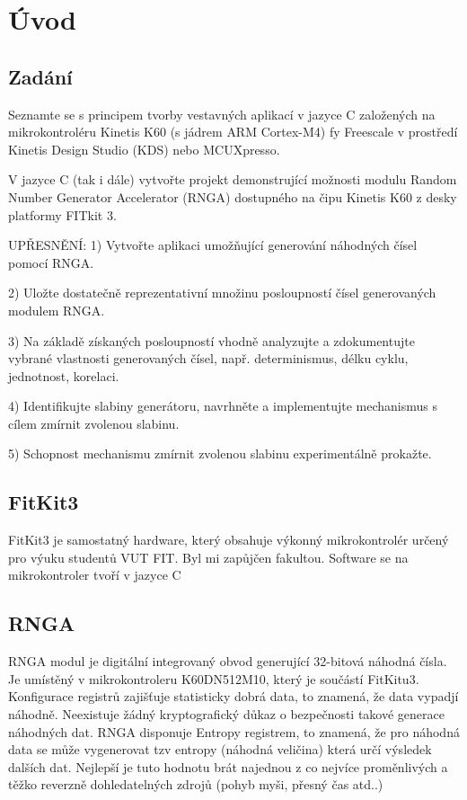 \documentclass[a4paper]{article}
\begin{document}
\section{Úvod}
\subsection{Zadání}
Seznamte se s principem tvorby vestavných aplikací v jazyce C založených na mikrokontroléru Kinetis K60 (s jádrem ARM Cortex-M4) fy Freescale v prostředí Kinetis Design Studio (KDS) nebo MCUXpresso.

\noindent V jazyce C (tak i dále) vytvořte projekt demonstrující možnosti modulu Random Number Generator Accelerator (RNGA) dostupného na čipu Kinetis K60 z desky platformy FITkit 3.

\noindent UPŘESNĚNÍ: 1) Vytvořte aplikaci umožňující generování náhodných čísel pomocí RNGA.

2) Uložte dostatečně reprezentativní množinu posloupností čísel generovaných modulem RNGA.

3) Na základě získaných posloupností vhodně analyzujte a zdokumentujte vybrané vlastnosti generovaných čísel, např. determinismus, délku cyklu, jednotnost, korelaci.

4) Identifikujte slabiny generátoru, navrhněte a implementujte mechanismus s cílem zmírnit zvolenou slabinu.

5) Schopnost mechanismu zmírnit zvolenou slabinu experimentálně prokažte.

\subsection{FitKit3}
FitKit3 je samostatný hardware, který obsahuje výkonný mikrokontrolér určený pro výuku studentů VUT FIT. Byl mi zapůjčen fakultou. Software se na mikrokontroler tvoří v jazyce C

\subsection{RNGA}
RNGA modul je digitální integrovaný obvod generující 32-bitová náhodná čísla. Je umístěný v mikrokontroleru K60DN512M10, který je součástí FitKitu3. Konfigurace registrů zajišťuje statisticky dobrá data, to znamená, že data vypadjí náhodně. Neexistuje žádný kryptografický důkaz o bezpečnosti takové generace náhodných dat\cite{documentation}. RNGA disponuje Entropy registrem, to znamená, že pro náhodná data se může vygenerovat tzv entropy (náhodná veličina) která určí výsledek dalších dat. Nejlepší je tuto hodnotu brát najednou z co nejvíce proměnlivých a těžko reverzně dohledatelných zdrojů (pohyb myši, přesný čas atd..)
\end{document}
